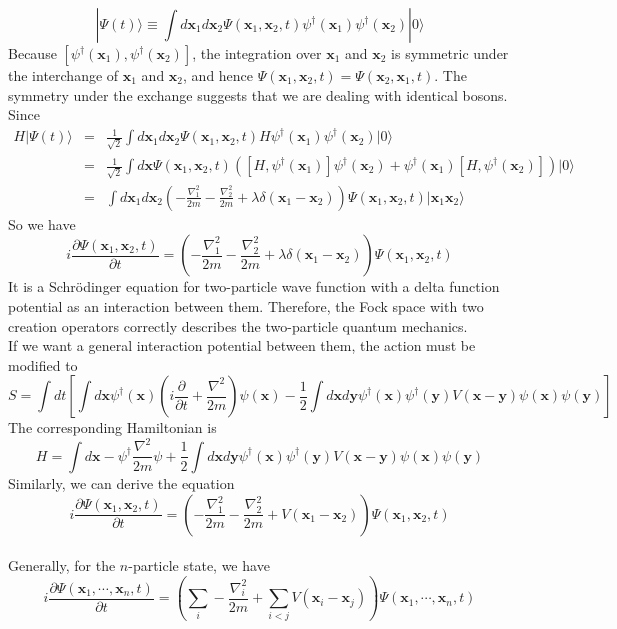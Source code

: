 \[|\Psi(t)\rangle \equiv \int d\bm{x}_1 d\bm{x}_2 \Psi(\bm{x}_1,\bm{x}_2,t)\psi^{\dagger}(\bm{x}_1)\psi^{\dagger}(\bm{x}_2)|0\rangle\]
Because $[\psi^{\dagger}(\bm{x}_1),\psi^{\dagger}(\bm{x}_2)]$, the integration over $\bm{x}_1$ and $\bm{x}_2$ is symmetric
under the interchange of $\bm{x}_1$ and $\bm{x}_2$, and hence 
$\Psi(\bm{x}_1,\bm{x}_2,t) =\Psi(\bm{x}_2,\bm{x}_1,t)$. 
The symmetry under the exchange suggests that we are dealing with identical bosons.\\
Since
\begin{eqnarray}
H|\Psi(t)\rangle &=& \frac{1}{\sqrt{2}} \int d\bm{x}_1 d\bm{x}_2 \Psi(\bm{x}_1,\bm{x}_2,t) H\psi^{\dagger}(\bm{x}_1)\psi^{\dagger}(\bm{x}_2)|0\rangle \nonumber \\
&=& \frac{1}{\sqrt{2}} \int d\bm{x} \Psi(\bm{x}_1,\bm{x}_2,t) ([H,\psi^{\dagger}(\bm{x}_1)]\psi^{\dagger}(\bm{x}_2) + \psi^{\dagger}(\bm{x}_1)[H,\psi^{\dagger}(\bm{x}_2)]) |0\rangle \nonumber \\
&=& \int d\bm{x}_1 d\bm{x}_2 \left( -\frac{\nabla^2_1}{2m}  -\frac{\nabla^2_2}{2m} + \lambda\delta(\bm{x}_1-\bm{x}_2)\right)\Psi(\bm{x}_1,\bm{x}_2,t) |\bm{x}_1\bm{x}_2\rangle \nonumber
\end{eqnarray}
So we have
\[i\frac{\partial \Psi(\bm{x}_1,\bm{x}_2,t)}{\partial t} = \left( -\frac{\nabla^2_1}{2m}  -\frac{\nabla^2_2}{2m} + \lambda\delta(\bm{x}_1-\bm{x}_2)\right)\Psi(\bm{x}_1,\bm{x}_2,t)\]
It is a Schrödinger equation for two-particle wave function with a delta function potential as an interaction between them.
Therefore, the Fock space with two creation operators correctly describes the two-particle quantum mechanics.\\
If we want a general interaction potential between them, the action must be modified to
\[S = \int dt \left[ \int d\bm{x} \psi^{\dagger}(\bm{x})\left( i\frac{\partial }{\partial t} + \frac{\nabla^2}{2m} \right)\psi(\bm{x}) - \frac{1}{2}\int d\bm{x} d\bm{y} \psi^{\dagger}(\bm{x}) \psi^{\dagger}(\bm{y}) V(\bm{x} - \bm{y}) \psi(\bm{x})\psi(\bm{y})\right]\]
The corresponding Hamiltonian is
\[H = \int d\bm{x} -\psi^{\dagger}\frac{\nabla^2}{2m}\psi + \frac{1}{2}\int d\bm{x} d\bm{y} \psi^{\dagger}(\bm{x}) \psi^{\dagger}(\bm{y}) V(\bm{x} - \bm{y}) \psi(\bm{x})\psi(\bm{y})\]
Similarly, we can derive the equation
\[i\frac{\partial \Psi(\bm{x}_1,\bm{x}_2,t)}{\partial t} = \left( -\frac{\nabla^2_1}{2m}  -\frac{\nabla^2_2}{2m} +  V(\bm{x}_1-\bm{x}_2)\right)\Psi(\bm{x}_1,\bm{x}_2,t)\]
\\
Generally, for the $n$-particle state, we have
\[i\frac{\partial \Psi(\bm{x}_1,\cdots,\bm{x}_n,t)}{\partial t} = \left( \sum_{i} -\frac{\nabla^2_i}{2m} +  \sum_{i < j}V(\bm{x}_i-\bm{x}_j)\right)\Psi(\bm{x}_1,\cdots,\bm{x}_n,t)\]
